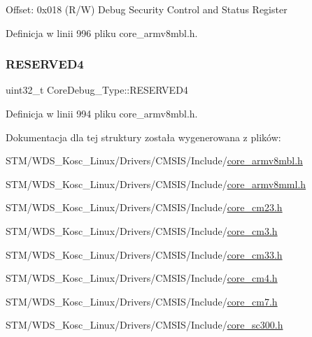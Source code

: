 Offset\+: 0x018 (R/W) Debug Security Control and Status Register 

Definicja w linii 996 pliku core\+\_\+armv8mbl.\+h.

\mbox{\label{struct_core_debug___type_ac965e9b3abb1519676f2a6a959eaedb2}} 
\subsubsection{\texorpdfstring{R\+E\+S\+E\+R\+V\+E\+D4}{RESERVED4}}
{\footnotesize\ttfamily uint32\+\_\+t Core\+Debug\+\_\+\+Type\+::\+R\+E\+S\+E\+R\+V\+E\+D4}



Definicja w linii 994 pliku core\+\_\+armv8mbl.\+h.



Dokumentacja dla tej struktury została wygenerowana z plików\+:\begin{DoxyCompactItemize}
\item 
S\+T\+M/\+W\+D\+S\+\_\+\+Kosc\+\_\+\+Linux/\+Drivers/\+C\+M\+S\+I\+S/\+Include/\hyperlink{core__armv8mbl_8h}{core\+\_\+armv8mbl.\+h}\item 
S\+T\+M/\+W\+D\+S\+\_\+\+Kosc\+\_\+\+Linux/\+Drivers/\+C\+M\+S\+I\+S/\+Include/\hyperlink{core__armv8mml_8h}{core\+\_\+armv8mml.\+h}\item 
S\+T\+M/\+W\+D\+S\+\_\+\+Kosc\+\_\+\+Linux/\+Drivers/\+C\+M\+S\+I\+S/\+Include/\hyperlink{core__cm23_8h}{core\+\_\+cm23.\+h}\item 
S\+T\+M/\+W\+D\+S\+\_\+\+Kosc\+\_\+\+Linux/\+Drivers/\+C\+M\+S\+I\+S/\+Include/\hyperlink{core__cm3_8h}{core\+\_\+cm3.\+h}\item 
S\+T\+M/\+W\+D\+S\+\_\+\+Kosc\+\_\+\+Linux/\+Drivers/\+C\+M\+S\+I\+S/\+Include/\hyperlink{core__cm33_8h}{core\+\_\+cm33.\+h}\item 
S\+T\+M/\+W\+D\+S\+\_\+\+Kosc\+\_\+\+Linux/\+Drivers/\+C\+M\+S\+I\+S/\+Include/\hyperlink{core__cm4_8h}{core\+\_\+cm4.\+h}\item 
S\+T\+M/\+W\+D\+S\+\_\+\+Kosc\+\_\+\+Linux/\+Drivers/\+C\+M\+S\+I\+S/\+Include/\hyperlink{core__cm7_8h}{core\+\_\+cm7.\+h}\item 
S\+T\+M/\+W\+D\+S\+\_\+\+Kosc\+\_\+\+Linux/\+Drivers/\+C\+M\+S\+I\+S/\+Include/\hyperlink{core__sc300_8h}{core\+\_\+sc300.\+h}\end{DoxyCompactItemize}
